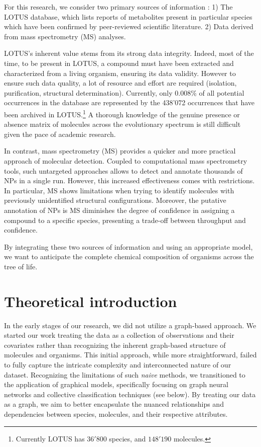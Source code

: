 \documentclass[
11pt, %
oneside, %
english, %
singlespacing, %
headsepline, %
chapterinoneline, %
]{MastersDoctoralThesis} %
\begin{document}
For this research, we consider two primary sources of information : 1) The LOTUS database, which lists reports of metabolites present in particular species which have been confirmed by peer-reviewed scientific literature. 2) Data derived from mass spectrometry (MS) analyses.

LOTUS's inherent value stems from its strong data integrity. Indeed, most of the time, to be present in LOTUS, a compound must have been extracted and characterized from a living organism, ensuring its data validity. However to ensure such data quality, a lot of resource and effort are required (isolation, purification, structural determination). Currently, only 0.008\% of all potential occurrences in the database are represented by the 438'072 occurrences that have been archived in LOTUS.\footnote{Currently LOTUS has $36'800$ species, and $148'190$ molecules.} A thorough knowledge of the genuine presence or absence matrix of molecules across the evolutionary spectrum is still difficult given the pace of academic research.

In contrast, mass spectrometry (MS) provides a quicker and more practical approach of molecular detection. Coupled to computational mass spectrometry tools, such untargeted approaches allows to detect and annotate thousands of NPs in a single run. However, this increased effectiveness comes with restrictions. In particular, MS shows limitations when trying to identify molecules with previously unidentified structural configurations. Moreover, the putative annotation of NPs is MS diminishes the degree of confidence in assigning a compound to a specific species, presenting a trade-off between throughput and confidence. 

By integrating these two sources of information and using an appropriate model, we want to anticipate the complete chemical composition of organisms across the tree of life. 




\chapter{Theoretical introduction}\label{chap:Theoretical introduction}
In the early stages of our research, we did not utilize a graph-based approach. We started our work treating the data as a collection of observations and their covariates rather than recognizing the inherent graph-based structure of molecules and organisms. This initial approach, while more straightforward, failed to fully capture the intricate complexity and interconnected nature of our dataset. Recognizing the limitations of such \textit{naive} methods, we transitioned to the application of graphical models, specifically focusing on graph neural networks and collective classification techniques (see below). By treating our data as a graph, we aim to better encapsulate the nuanced relationships and dependencies between species, molecules, and their respective attributes.
\end{document}
